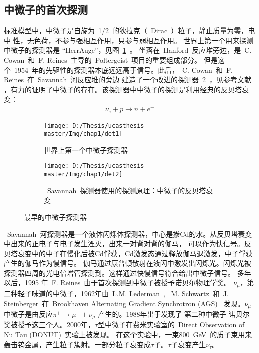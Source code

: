 \subsection{中微子的首次探测}
标准模型中，中微子是自旋为~1/2~的狄拉克（~Dirac~）粒子，静止质量为零，电中
性，无色荷，不参与强相互作用，只参与弱相互作用。
世界上第一个用来探测中微子的探测器是 ``HerrAuge''，见图~\ref{fig:det_1}~。
 坐落在~Hanford~反应堆旁边，是~C. Cowan~和~F. Reines~主导的~Poltergeist~项目的重要组成部分。
 但是这个~1954~年的先驱性的探测器本底远远高于信号。此后，~C. Cowan~和~F. Reines~在~Savannah~河反应堆的旁边
 建造了一个改进的探测器~\ref{fig:det_2}~，见参考文献
\citep{kruse1956detection,reines1960detection}，有力的证明了中微子的存在。该探测器中中微子的探测是利用经典的反贝塔衰变：
\begin{eqnarray}\label{eq:ibd}
\bar{\nu_e} + p \rightarrow n + e^+
\end{eqnarray}
\begin{figure}[!htbp]
  \centering
  \begin{subfigure}[b]{\MySubFactor\textwidth}
    \texttt{[image: D:/Thesis/ucasthesis-master/Img/chap1/det1]}
    \caption{世界上第一个中微子探测器}
    \label{fig:det_1}
  \end{subfigure}%
  \quad\quad\quad\quad\quad\quad%
  \begin{subfigure}[b]{\MySubFactor\textwidth}
    \texttt{[image: D:/Thesis/ucasthesis-master/Img/chap1/det2]}
    \caption{~Savannah~探测器使用的探测原理：中微子的反贝塔衰变}
    \label{fig:det_2}
  \end{subfigure}
  \caption{最早的中微子探测器}
  \label{fig:det}
\end{figure}
~Savannah~河探测器是一个液体闪烁体探测器，中心是掺Cd的水。从反贝塔衰变中出来的正电子与电子发生湮灭，出来一对背对背的伽马，
可以作为快信号。反贝塔衰变中的中子在慢化后被Cd俘获，Cd激发态通过释放伽马退激发，中子俘获产生的伽马作为慢信号。
伽马通过康普顿散射在液闪中激发出闪烁光。闪烁光被探测器四周的光电倍增管探测到。这样通过快慢信号符合给出中微子信号。
多年以后，1995 年~F. Reines~由于首次探测到中微子被授予诺贝尔物理学奖。
$\nu_{\mu}$，第二种轻子味道的中微子，1962年由~L.M. Lederman~, ~M. Schwartz~和~J. Steinberger~在~Brookhaven Alternating Gradient Synchrotron (AGS)~
发现\citep{danby1962observation}。$\nu_{\mu}$ 中微子是由反应$\pi^+ \rightarrow \mu^+ + \nu_{\mu}$ 产生的。1988年出于发现了
第二种中微子
诺贝尔奖被授予这三个人。2000年，$\tau$型中微子在费米实验室的~Direct Observation of Nu Tau (DONUT)~实验上被发现\citep{kodama2001observation}。
在这个实验中，一束800~GeV~的质子束用来轰击钨金属，产生粒子簇射。一部分粒子衰变成$\tau$子。$\tau$子衰变产生$\nu_{\tau}$。
